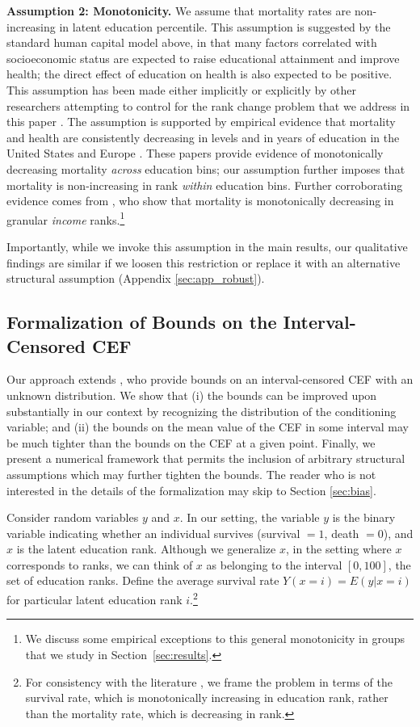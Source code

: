 \documentclass[12pt,letterpaper]{article}
\numberwithin{equation}{section}
\begin{document}
\textbf{Assumption 2: Monotonicity.} We assume that mortality rates are non-increasing in latent education percentile. This assumption is suggested by the standard human capital model above, in that many factors correlated with socioeconomic status are expected to raise educational attainment and improve health; the direct effect of education on health is also expected to be positive. This assumption has been made either implicitly or explicitly by other researchers attempting to control for the rank change problem that we address in this paper \citep{Cutler2011,Bound2015,Hendi2015,Goldring2016}. The assumption is supported by empirical evidence that mortality and health are consistently decreasing in levels and in years of education in the United States and Europe \citep{Pappas1993,Mackenbach2003,Meara2008,Cutler2010}. These papers provide evidence of monotonically decreasing mortality \textit{across} education bins; our assumption further imposes that mortality is non-increasing in rank \textit{within} education bins. Further corroborating evidence comes from \citet{chetty2016}, who show that mortality is monotonically decreasing in granular \textit{income} ranks.\footnote{We discuss some empirical exceptions to this general monotonicity in groups that we study in Section~\ref{sec:results}.}

Importantly, while we invoke this assumption in the main results, our qualitative findings are similar if we loosen this restriction or replace it with an alternative structural assumption (Appendix \ref{sec:app_robust}).

\subsection{Formalization of Bounds on the Interval-Censored CEF}

Our approach extends \citet{Manski2002}, who provide bounds on an interval-censored CEF with an unknown distribution. We show that (i) the \citet{Manski2002} bounds can be improved upon substantially in our context by recognizing the distribution of the conditioning variable; and (ii) the bounds on the mean value of the CEF in some interval may be much tighter than the bounds on the CEF at a given point. Finally, we present a numerical framework that permits the inclusion of arbitrary structural assumptions which may further tighten the bounds. The reader who is not interested in the details of the formalization may skip to Section \ref{sec:bias}.

Consider random variables $y$ and $x$. In our setting, the variable $y$ is the binary variable
indicating whether an individual survives (survival $= 1$, death
$=0$), and $x$ is the latent education
rank. Although we generalize $x$, in the setting where $x$ corresponds to ranks, we can
think of $x$ as belonging to the interval $[0,100]$, the set of education ranks.
Define the average survival rate $Y(x=i) = E(y|x=i)$ for particular latent
education rank $i$.\footnote{For consistency with the literature
  \citep{Manski2002}, we frame the problem in terms of the survival
  rate, which is monotonically increasing in education rank, rather
  than the mortality rate, which is decreasing in rank.} 
\end{document}
